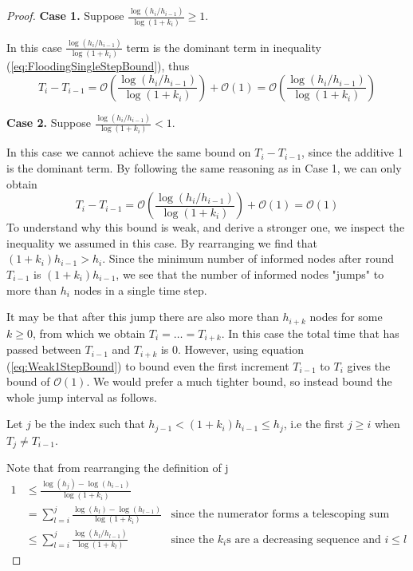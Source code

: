 \begin{proof}
	\textbf{Case 1.} Suppose $\frac{\log (h_i/h_{i-1})}{\log(1+k_i)} \geq 1$.

	In this case $\frac{\log (h_i/h_{i-1})}{\log(1+k_i)}$ term is the dominant term in inequality (\ref{eq:FloodingSingleStepBound}), thus
	$$
		T_i - T_{i-1} = \mathcal{O}\left( \frac{\log (h_i/h_{i-1})}{\log(1+k_i) }\right) + \mathcal{O}(1) = \mathcal{O}\left( \frac{\log (h_i/h_{i-1})}{\log(1+k_i) }\right)
	$$

	\textbf{Case 2.} Suppose $\frac{\log (h_i/h_{i-1})}{\log(1+k_i)} < 1$.

	In this case we cannot achieve the same bound on $T_i - T_{i-1}$, since the additive 1 is the dominant term. By following the same reasoning as in Case 1, we can only obtain
	\begin{equation}\label{eq:Weak1StepBound}
		T_i - T_{i-1} = \mathcal{O}\left( \frac{\log (h_i/h_{i-1})}{\log(1+k_i) }\right) + \mathcal{O}(1) = \mathcal{O}(1)
	\end{equation}
	To understand why this bound is weak, and derive a stronger one, we inspect the inequality we assumed in this case. %
	By rearranging we find that $(1+k_i)h_{i-1} > h_i$. Since the minimum number of informed nodes after round $T_{i-1}$ is $(1+k_i)h_{i-1}$, we see that the number of informed nodes "jumps" to more than $h_i$ nodes in a single time step. %

	It may be that after this jump there are also more than $h_{i+k}$ nodes for some $k \geq 0$, from which we obtain $T_i = \dots = T_{i+k}$. In this case the total time that has passed between $T_{i-1}$ and $T_{i+k}$ is 0. However, using equation (\ref{eq:Weak1StepBound}) to bound even the first increment $T_{i-1}$ to $T_i$ gives the bound of $\mathcal{O}(1)$. We would prefer a much tighter bound, so instead bound the whole jump interval as follows. %
	
	Let $j$ be the index such that $h_{j-1} < (1+k_i)h_{i-1} \leq h_j$, i.e the first $j \geq i$ when $T_j \neq T_{i-1}$. %

	Note that from rearranging the definition of j
	\begin{align*}\label{eq:JumpBoundGeq1}
		1 &\leq \frac{\log (h_j) - \log(h_{i-1})}{\log(1+k_i) } \\
		& =\sum_{l=i}^j \frac{\log (h_{l}) - \log(h_{l-1})}{\log(1+k_i) } & \text{since the numerator forms a telescoping sum} \\
		& \leq \sum_{l=i}^j \frac{\log (h_{l}/h_{l-1})}{\log(1+k_l) } & \text{since the } k_i \text{s are a decreasing sequence and } i \leq l
	\end{align*}
	

\end{proof}
